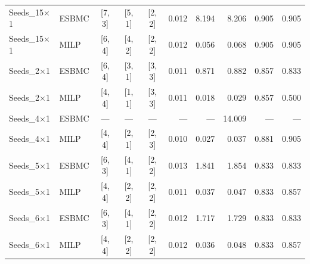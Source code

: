 \begin{table}[htbp]
\begin{tabular}{@{}llccc rrr rr@{}}
\hline
Seeds\_15$\times$1 & ESBMC & {[7, 3]} & {[5, 1]} & {[2, 2]} & 0.012 & 8.194 & 8.206 & 0.905 & 0.905 \\
Seeds\_15$\times$1 & MILP & {[6, 4]} & {[4, 2]} & {[2, 2]} & 0.012 & 0.056 & 0.068 & 0.905 & 0.905 \\
\hline
Seeds\_2$\times$1 & ESBMC & {[6, 4]} & {[3, 1]} & {[3, 3]} & 0.011 & 0.871 & 0.882 & 0.857 & 0.833 \\
Seeds\_2$\times$1 & MILP & {[4, 4]} & {[1, 1]} & {[3, 3]} & 0.011 & 0.018 & 0.029 & 0.857 & 0.500 \\
\hline
Seeds\_4$\times$1 & ESBMC & --- & --- & --- & --- & --- & 14.009 & --- & --- \\
Seeds\_4$\times$1 & MILP & {[4, 4]} & {[2, 1]} & {[2, 3]} & 0.010 & 0.027 & 0.037 & 0.881 & 0.905 \\
\hline
Seeds\_5$\times$1 & ESBMC & {[6, 3]} & {[4, 1]} & {[2, 2]} & 0.013 & 1.841 & 1.854 & 0.833 & 0.833 \\
Seeds\_5$\times$1 & MILP & {[4, 4]} & {[2, 2]} & {[2, 2]} & 0.011 & 0.037 & 0.047 & 0.833 & 0.857 \\
\hline
Seeds\_6$\times$1 & ESBMC & {[6, 3]} & {[4, 1]} & {[2, 2]} & 0.012 & 1.717 & 1.729 & 0.833 & 0.833 \\
Seeds\_6$\times$1 & MILP & {[4, 4]} & {[2, 2]} & {[2, 2]} & 0.012 & 0.036 & 0.048 & 0.833 & 0.857 \\
\hline
\end{tabular}
\end{table}